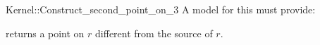 \begin{ccRefFunctionObjectConcept}{Kernel::Construct_second_point_on_3}
A model for this must provide:


{returns a point on $r$ different from the source of $r$.}

\end{ccRefFunctionObjectConcept}
